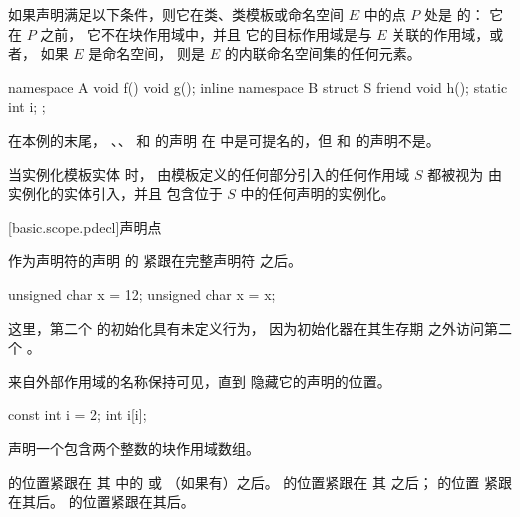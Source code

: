 \pnum
{}%
如果声明满足以下条件，则它在类、类模板或命名空间 $E$ 中的点 $P$ 处是  的：
它在 $P$ 之前，
它不在块作用域中，并且
它的目标作用域是与 $E$ 关联的作用域，或者，
如果 $E$ 是命名空间，
则是 $E$ 的内联命名空间集的任何元素。
\begin{example}
\begin{codeblock}
namespace A {
  void f() {void g();}
  inline namespace B {
    struct S {
      friend void h();
      static int i;
    };
  }
}
\end{codeblock}
在本例的末尾，
、、 和  的声明
在  中是可提名的，但  和  的声明不是。
\end{example}

\pnum
当实例化模板实体 时，
由模板定义的任何部分引入的任何作用域 $S$ 都被视为
由实例化的实体引入，并且
包含位于 $S$ 中的任何声明的实例化。

[basic.scope.pdecl]{声明点}

%
%
%

\pnum
{}%
作为声明符的声明 的 
紧跟在完整声明符 之后。
\begin{example}
\begin{codeblock}
unsigned char x = 12;
{ unsigned char x = x; }
\end{codeblock}
这里，第二个  的初始化具有未定义行为，
因为初始化器在其生存期 之外访问第二个 。
\end{example}

\pnum
\begin{note}
%
来自外部作用域的名称保持可见，直到
隐藏它的声明的位置。
\begin{example}
\begin{codeblock}
const int i = 2;
{ int i[i]; }
\end{codeblock}
声明一个包含两个整数的块作用域数组。
\end{example}
\end{note}

\pnum
{} 的位置紧跟在
其  中的  或 （如果有）之后。
 的位置紧跟在
其  之后；
 的位置
紧跟在其后。
 的位置紧跟在其后。

